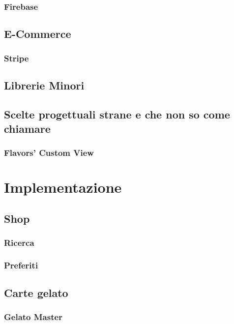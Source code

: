 \documentclass{article}
\begin{document}
\subsubsection{Firebase}

\subsection{E-Commerce}

\subsubsection{Stripe}

\subsection{Librerie Minori}

\subsection{Scelte progettuali strane e che non so come chiamare}

\subsubsection{Flavors’ Custom View}

  \newpage
\section{Implementazione}

\subsection{Shop}

\subsubsection{Ricerca}

\subsubsection{Preferiti}

\subsection{Carte gelato}

\subsubsection{Gelato Master}
\end{document}

